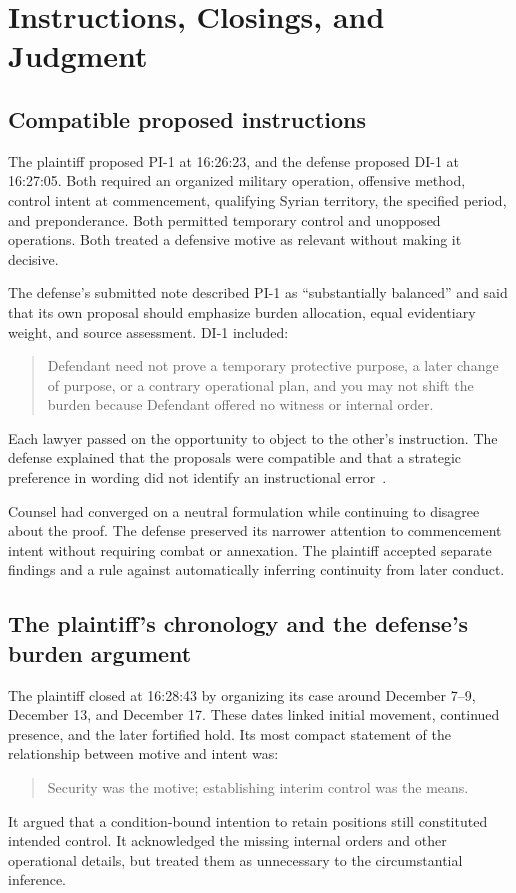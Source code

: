 \section{Instructions, Closings, and Judgment}

\subsection{Compatible proposed instructions}

The plaintiff proposed PI-1 at 16:26:23, and the defense proposed DI-1 at 16:27:05.  Both required an organized military operation, offensive method, control intent at commencement, qualifying Syrian territory, the specified period, and preponderance.  Both permitted temporary control and unopposed operations.  Both treated a defensive motive as relevant without making it decisive.

The defense's submitted note described PI-1 as “substantially balanced” and said that its own proposal should emphasize burden allocation, equal evidentiary weight, and source assessment.  DI-1 included:
\begin{quote}
Defendant need not prove a temporary protective purpose, a later change of purpose, or a contrary operational plan, and you may not shift the burden because Defendant offered no witness or internal order.
\end{quote}
Each lawyer passed on the opportunity to object to the other's instruction.  The defense explained that the proposals were compatible and that a strategic preference in wording did not identify an instructional error~\cite[events 327--330 and notes at 16:26:43--16:27:29]{record}.

Counsel had converged on a neutral formulation while continuing to disagree about the proof.  The defense preserved its narrower attention to commencement intent without requiring combat or annexation.  The plaintiff accepted separate findings and a rule against automatically inferring continuity from later conduct.

\subsection{The plaintiff's chronology and the defense's burden argument}

The plaintiff closed at 16:28:43 by organizing its case around December 7--9, December 13, and December 17.  These dates linked initial movement, continued presence, and the later fortified hold.  Its most compact statement of the relationship between motive and intent was:
\begin{quote}
Security was the motive; establishing interim control was the means.
\end{quote}
It argued that a condition-bound intention to retain positions still constituted intended control.  It acknowledged the missing internal orders and other operational details, but treated them as unnecessary to the circumstantial inference.

